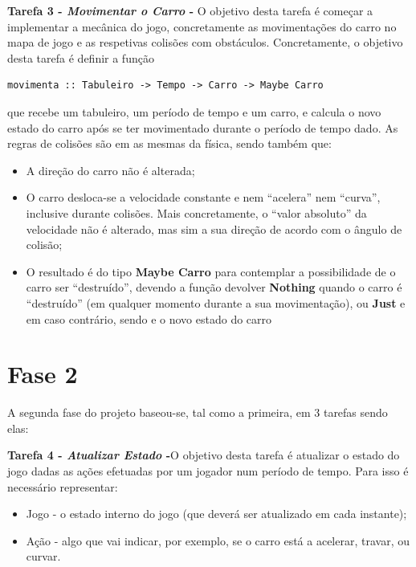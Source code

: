 \documentclass[a4paper]{report} %
\begin{document}
\textbf{ Tarefa 3 - \emph{Movimentar o Carro} -} O objetivo desta tarefa é começar a implementar a mecânica do jogo, concretamente as
movimentações do carro no mapa de jogo e as respetivas colisões com obstáculos. Concretamente, o objetivo desta tarefa é definir a função

\begin{verbatim}
movimenta :: Tabuleiro -> Tempo -> Carro -> Maybe Carro 
\end{verbatim}

que recebe um tabuleiro, um período de tempo e um
carro, e calcula o novo estado do carro após se ter movimentado durante o período de tempo
dado. As regras de colisões são em as mesmas da física, sendo também que: 
\begin{itemize}
\item A direção do carro não é alterada;
\item O carro desloca-se a velocidade constante e nem “acelera” nem “curva”, inclusive
durante colisões. Mais concretamente, o “valor absoluto” da velocidade não é alterado,
mas sim a sua direção de acordo com o ângulo de colisão;
\item O resultado é do tipo \textbf{Maybe Carro} para contemplar a possibilidade de o carro ser
“destruído”, devendo a função devolver \textbf{Nothing} quando o carro é “destruído” (em
qualquer momento durante a sua movimentação), ou \textbf{Just} e em caso contrário, sendo
e o novo estado do carro
\end{itemize}

\section{Fase 2}
\label{sec:analisefase2}

A segunda fase do projeto baseou-se, tal como a primeira, em 3 tarefas sendo elas:

\textbf{ Tarefa 4 - \emph{Atualizar Estado} -}O objetivo desta tarefa é atualizar o estado do jogo dadas as ações efetuadas por um
jogador num período de tempo. Para isso é necessário representar:

\begin{itemize}

\item  Jogo - o estado interno do jogo (que deverá ser atualizado em cada instante);
\item Ação - algo que vai indicar, por exemplo, se o carro está a acelerar, travar, ou curvar. 

\end{itemize}
\end{document}
